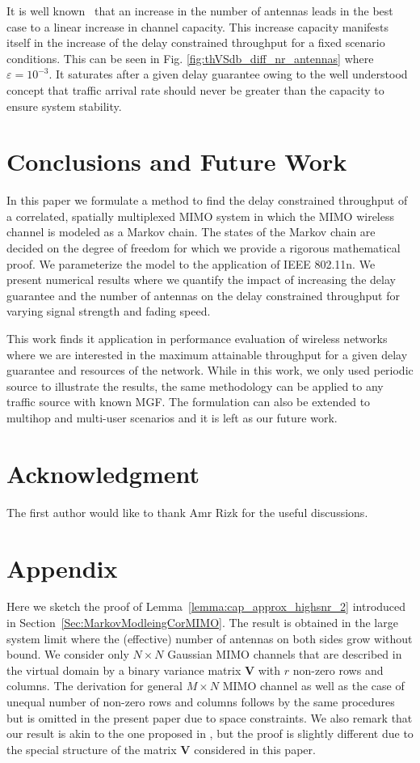 \documentclass[10pt,conference]{IEEEtran}
\newcommand{\rankH}{r}
\begin{document}
It is well known~\cite{MIMO:Teletar99:CapacityOfMultiAntennaGaus} that an increase in the number of antennas leads in the best case to a linear increase in channel capacity.
This increase capacity manifests itself in the increase of the delay constrained throughput for a fixed scenario conditions.
This can be seen in Fig. \ref{fig:thVSdb_diff_nr_antennas} where $\varepsilon = 10^{-3}$.
It saturates after a given delay guarantee owing to the well understood concept that traffic arrival rate should never be greater than the capacity to ensure system stability.
\section{Conclusions and Future Work}
In this paper we formulate a method to find the delay constrained throughput of a correlated, spatially multiplexed MIMO system in which the MIMO wireless channel is modeled as a Markov chain.
The states of the Markov chain are decided on the degree of freedom for which we provide a rigorous mathematical proof.
We parameterize the model to the application of IEEE 802.11n.
We present numerical results where we quantify the impact of increasing the delay guarantee and the number of antennas on the delay constrained throughput for varying signal strength and fading speed.


This work finds it application in performance evaluation of wireless networks where we are interested in the maximum attainable throughput for a given delay guarantee and resources of the network.
While in this work, we only used periodic source to illustrate the results, the same methodology can be applied to any traffic source with known MGF.
The formulation can also be extended to multihop and multi-user scenarios and it is left as our future work.
\section*{Acknowledgment}
The first author would like to thank Amr Rizk for the useful discussions.

\section*{Appendix}
\label{Ap:Aggregation}

Here we sketch the proof of Lemma~\ref{lemma:cap_approx_highsnr_2} introduced in Section~\ref{Sec:MarkovModleingCorMIMO}.  The result is obtained in the large system limit where the (effective) number of antennas on both sides grow without bound.
We consider only $N \times N$  Gaussian MIMO channels that are described in the virtual domain by a binary variance matrix $\mathbf{V}$ with $\rankH$ non-zero rows and columns.  The derivation for general $M \times N$ MIMO channel as well as the case of unequal number of non-zero rows and columns follows by the same procedures but is omitted in the present paper due to space constraints.
We also remark that our result is akin to the one proposed in \cite{Raghavan:2010:WKM}, but the proof is slightly different due to the special structure of the matrix $\mathbf{V}$ considered in this paper.
\end{document}
